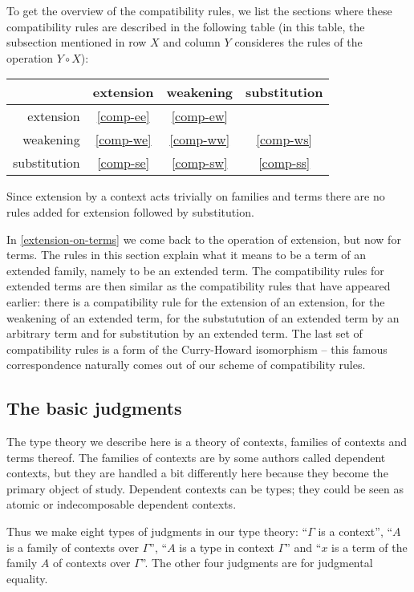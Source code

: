 To get the overview of the compatibility rules, we list the sections
where these compatibility rules are described in the following table (in this
table, the
subsection mentioned in row $X$ and column $Y$ consideres the rules of the
operation $Y\circ X$):
\begin{center}
\begin{tabular}{r|ccc}
& extension & weakening & substitution\\
\hline
extension & \autoref{comp-ee} & \autoref{comp-ew} & \\
weakening & \autoref{comp-we} & \autoref{comp-ww} & \autoref{comp-ws}\\
substitution & \autoref{comp-se} & \autoref{comp-sw} & \autoref{comp-ss}
\end{tabular}
\end{center}
Since extension by a context acts trivially on families and terms there are
no rules added for extension followed by substitution.

In \autoref{extension-on-terms} we come back to the operation of extension, but
now for terms. The rules in this section explain what it means to be a term of
an extended family, namely to be an extended term. The compatibility rules for
extended terms are then similar as the compatibility rules that have appeared
earlier: there is a compatibility rule for the extension of an extension, for
the weakening of an extended term, for the substutution of an extended term by
an arbitrary term and for substitution by an extended term. The last set of
compatibility rules is a form of the Curry-Howard isomorphism -- this famous
correspondence naturally comes out of our scheme of compatibility rules.

\subsection{The basic judgments}
The type theory we describe here is a theory of contexts, families of
contexts and terms thereof. The families of contexts are by some authors called
dependent contexts, but they are handled a bit differently here because they
become the primary object of study. Dependent contexts can be types; they could
be seen as atomic or indecomposable dependent contexts.

Thus we make eight types of judgments in our type theory: ``$\Gamma$ is a context'',
``$A$ is a family of contexts over $\Gamma$'', ``$A$ is a type in context $\Gamma$''
and ``$x$ is a term of the family $A$ of contexts over $\Gamma$''. The other four
judgments are for judgmental equality. 

